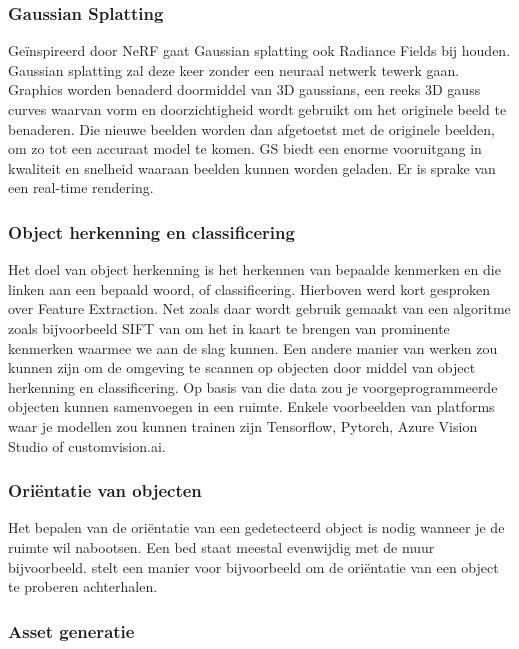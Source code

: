 \subsubsection{Gaussian Splatting}

Geïnspireerd door NeRF gaat Gaussian splatting ook Radiance Fields bij houden. Gaussian splatting zal deze keer zonder een neuraal netwerk tewerk gaan. Graphics worden benaderd doormiddel van 3D gaussians, een reeks 3D gauss curves waarvan vorm en doorzichtigheid wordt gebruikt om het originele beeld te benaderen. Die nieuwe beelden worden dan afgetoetst met de originele beelden, om zo tot een accuraat model te komen.
GS biedt een enorme vooruitgang in kwaliteit en snelheid waaraan beelden kunnen worden geladen. Er is sprake van een real-time rendering. \autocite{Kerbl2023}


\subsubsection{Object herkenning en classificering}

Het doel van object herkenning is het herkennen van bepaalde kenmerken en die linken aan een bepaald woord, of classificering. Hierboven werd kort gesproken over Feature Extraction. Net zoals daar wordt gebruik gemaakt van een algoritme zoals bijvoorbeeld SIFT van \textcite{Schonberger2016} om het in kaart te brengen van prominente kenmerken waarmee we aan de slag kunnen.
Een andere manier van werken zou kunnen zijn om de omgeving te scannen op objecten door middel van object herkenning en classificering. Op basis van die data zou je voorgeprogrammeerde objecten kunnen samenvoegen in een ruimte.
Enkele voorbeelden van platforms waar je modellen zou kunnen trainen zijn Tensorflow, Pytorch, Azure Vision Studio of customvision.ai.

\subsubsection{Oriëntatie van objecten}

Het bepalen van de oriëntatie van een gedetecteerd object is nodig wanneer je de ruimte wil nabootsen. Een bed staat meestal evenwijdig met de muur bijvoorbeeld. \textcite{Saxena2009} stelt een manier voor bijvoorbeeld om de oriëntatie van een object te proberen achterhalen.

\subsubsection{Asset generatie}


